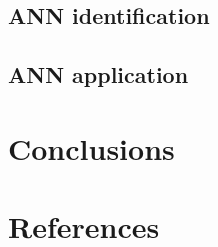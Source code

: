 \documentclass[final,3p,times,twocolumn]{elsarticle}
\begin{document}
\subsection{ANN identification}
\label{subsec:annmodeliden}
\lipsum[1]


\subsection{ANN application}
\label{subsec:annapplication}
\lipsum[1]






\section{Conclusions}
\label{sec:conclusions}
\lipsum[1]




%




\section{References}
\label{sec:references}

 



\begin{thebibliography}{00}


\bibitem{}

\end{thebibliography}
\end{document}

